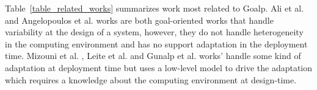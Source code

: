 Table~\ref{table_related_works} summarizes work most related to Goalp. Ali et al.\citep{ali_requirements-driven_2014} and Angelopoulos et al. \cite{angelopoulos_capturing_2015} works are both goal-oriented works that handle variability at the design of a system, however, they do not handle heterogeneity in the computing environment and has no support adaptation in the deployment time. Mizouni et al. \citep{mizouni_framework_2014}, Leite et al. \citep{ferreira_leite_user_2014} and Gunalp et al.\citep{gunalp_rondo_2015} works' handle some kind of adaptation at deployment time but uses a low-level model to drive the adaptation which requires a knowledge about the computing environment at design-time.


